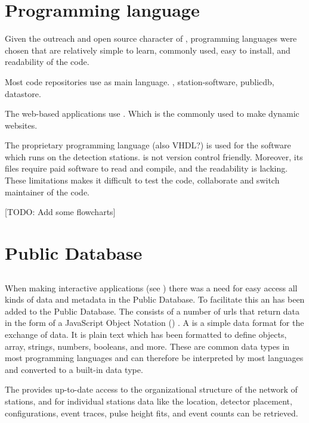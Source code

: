 \section{Programming language}

Given the outreach and open source character of \hisparc, programming languages were chosen that are relatively simple to learn, commonly used, easy to install, and readability of the code.

Most code repositories use \python as main language.
\sapphire, station-software, publicdb, datastore.

The web-based applications use \javascript. Which is the commonly used to make dynamic websites.

The proprietary programming language \labview (also VHDL?) is used for the  \daq software which runs on the detection stations. \labview is not version control friendly. Moreover, its files require paid software to read and compile, and the readability is lacking. These limitations makes it difficult to test the code, collaborate and switch maintainer of the code.


[TODO: Add some flowcharts]


\section{\hisparc Public Database}

\subsection{\api}

When making interactive applications (see \jsparc) there was a need for easy access all kinds of data and metadata in the Public Database. To facilitate this an \api has been added to the Public Database. The \api consists of a number of urls that return data in the form of a JavaScript Object Notation (\json) \cite{rfc7159}. A \json is a simple data format for the exchange of data. It is plain text which has been formatted to define objects, array, strings, numbers, booleans, and more. These are common data types in most programming languages and can therefore be interpreted by most languages and converted to a built-in data type.

The \api provides up-to-date access to the organizational structure of the \hisparc network of stations, and for individual stations data like the \gps location, detector placement, configurations, event traces, pulse height fits, and event counts can be retrieved.

